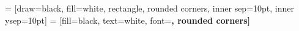  = [draw=black, fill=white,
    rectangle, rounded corners, inner sep=10pt, inner ysep=10pt]
 = [fill=black, text=white, font=\bfseries, rounded corners]


\newcommand{\ejemplo}[1]{\createbox{Ejemplo}{#1}}

\addto\captionsenglish{\renewcommand{\proofname}{Demostración}}

\newcommand{\dem}[1]{\begin{proof}#1\end{proof}}



\usepackage{hyperref}

